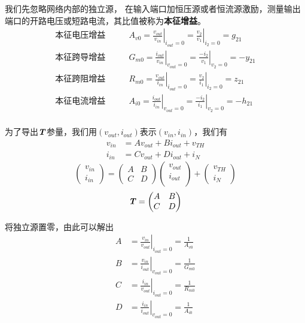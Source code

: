    我们先忽略网络内部的独立源，
    在输入端口加恒压源或者恒流源激励，测量输出端口的开路电压或短路电流，其比值被称为\textbf{本征增益}。
    \begin{align*}
        \text{本征电压增益}\qquad & A_{v0}=\left.\frac{v_{out}}{v_{in}}\right|_{i_{out}=0}=\left.\frac{v_{2}}{v_{1}}
        \right|_{i_2=0}=g_{21}\\
        \text{本征跨导增益}\qquad & G_{m0}=\left.\frac{i_{out}}{v_{in}}\right|_{v_{out}=0}=\left.\frac{-i_{2}}{v_{1}}
        \right|_{v_2=0}=-y_{21}\\
        \text{本征跨阻增益}\qquad & R_{m0}=\left.\frac{v_{out}}{i_{in}}\right|_{i_{out}=0}=\left.\frac{v_{2}}{i_{1}}
        \right|_{i_2=0}=z_{21}\\
        \text{本征电流增益}\qquad & A_{i0}=\left.\frac{i_{out}}{i_{in}}\right|_{v_{out}=0}=\left.\frac{-i_{2}}{i_{1}}
        \right|_{v_2=0}=-h_{21}\\
    \end{align*}
    \par 为了导出$\textbf{\textit{T}}$参量，我们用$(v_{out},i_{out})$表示$(v_{in},i_{in})$，我们有
    \begin{align*}
        v_{in}&=Av_{out}+Bi_{out}+v_{TH}\\
        i_{in}&=Cv_{out}+Di_{out}+i_{N}
    \end{align*}
    \[
    \begin{pmatrix}
        v_{in} \\ i_{in}
    \end{pmatrix}
    =
    \begin{pmatrix}
        A & B \\ C & D
    \end{pmatrix}
    \begin{pmatrix}
        v_{out} \\ i_{out} \\
    \end{pmatrix}
    +
    \begin{pmatrix}
        v_{TH} \\ i_{N}
    \end{pmatrix}
    \]
    \[
    \textbf{\textit{T}}=
    \begin{pmatrix}
        A & B \\
        C & D 
    \end{pmatrix} 
    \]
    \par 将独立源置零，由此可以解出
    \begin{align*}
        A&=\left.\frac{v_{in}}{v_{out}}\right|_{i_{out}=0}=\frac{1}{A_{v0}}\\
        B&=\left.\frac{v_{in}}{i_{out}}\right|_{v_{out}=0}=\frac{1}{G_{m0}}\\
        C&=\left.\frac{i_{in}}{v_{out}}\right|_{i_{out}=0}=\frac{1}{R_{m0}}\\
        D&=\left.\frac{i_{in}}{i_{out}}\right|_{v_{out}=0}=\frac{1}{A_{i0}}\\
    \end{align*}
